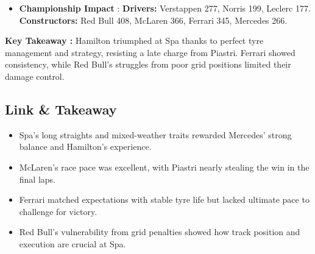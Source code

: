 \begin{itemize}
    \item \textbf{Championship Impact} : \textbf{Drivers:} Verstappen 277, Norris 199, Leclerc 177. \\
    \textbf{Constructors:} Red Bull 408, McLaren 366, Ferrari 345, Mercedes 266.
\end{itemize}

\textbf{Key Takeaway :} Hamilton triumphed at Spa thanks to perfect tyre management and strategy, resisting a late charge from Piastri. Ferrari showed consistency, while Red Bull’s struggles from poor grid positions limited their damage control.


\subsection{Link \& Takeaway}

\begin{itemize}
    \item Spa’s long straights and mixed-weather traits rewarded Mercedes’ strong balance and Hamilton’s experience. 
    \item McLaren’s race pace was excellent, with Piastri nearly stealing the win in the final laps. 
    \item Ferrari matched expectations with stable tyre life but lacked ultimate pace to challenge for victory. 
    \item Red Bull’s vulnerability from grid penalties showed how track position and execution are crucial at Spa. 
\end{itemize}